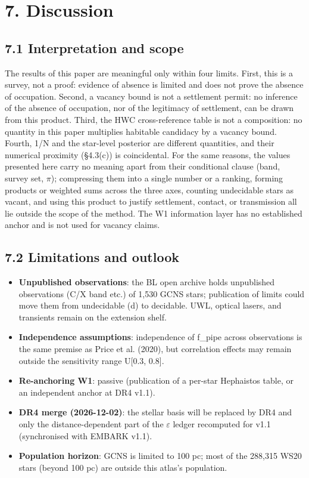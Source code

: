 \documentclass[11pt]{article}
\begin{document}
\section*{7. Discussion}

\subsection*{7.1 Interpretation and scope}
\noindent The results of this paper are meaningful only within four limits. First, this is a survey, not a proof: evidence of absence is limited and does not prove the absence of occupation. Second, a vacancy bound is not a settlement permit: no inference of the absence of occupation, nor of the legitimacy of settlement, can be drawn from this product. Third, the HWC cross-reference table is not a composition: no quantity in this paper multiplies habitable candidacy by a vacancy bound. Fourth, 1/N and the star-level posterior are different quantities, and their numerical proximity (\S{}4.3(c)) is coincidental. For the same reasons, the values presented here carry no meaning apart from their conditional clause (band, survey set, \(\pi\)); compressing them into a single number or a ranking, forming products or weighted sums across the three axes, counting undecidable stars as vacant, and using this product to justify settlement, contact, or transmission all lie outside the scope of the method. The W1 information layer has no established anchor and is not used for vacancy claims.\par\smallskip

\subsection*{7.2 Limitations and outlook}
\begin{itemize}\setlength{\itemsep}{1pt}
\item \textbf{Unpublished observations}: the BL open archive holds unpublished observations (C/X band etc.) of 1,530 GCNS stars; publication of limits could move them from undecidable (d) to decidable. UWL, optical lasers, and transients remain on the extension shelf.
\item \textbf{Independence assumptions}: independence of f\_pipe across observations is the same premise as Price et al. (2020), but correlation effects may remain outside the sensitivity range U[0.3, 0.8].
\item \textbf{Re-anchoring W1}: passive (publication of a per-star Hephaistos table, or an independent anchor at DR4 v1.1).
\item \textbf{DR4 merge (2026-12-02)}: the stellar basis will be replaced by DR4 and only the distance-dependent part of the \(\varepsilon\) ledger recomputed for v1.1 (synchronised with EMBARK v1.1).
\item \textbf{Population horizon}: GCNS is limited to 100 pc; most of the 288,315 WS20 stars (beyond 100 pc) are outside this atlas's population.
\end{itemize}
\end{document}
